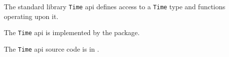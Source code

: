 
The standard library {\tt Time} api defines access to a {\tt Time} type and 
functions operating upon it.

The {\tt Time} api is implemented by the  package.

The {\tt Time} api source code is in .

